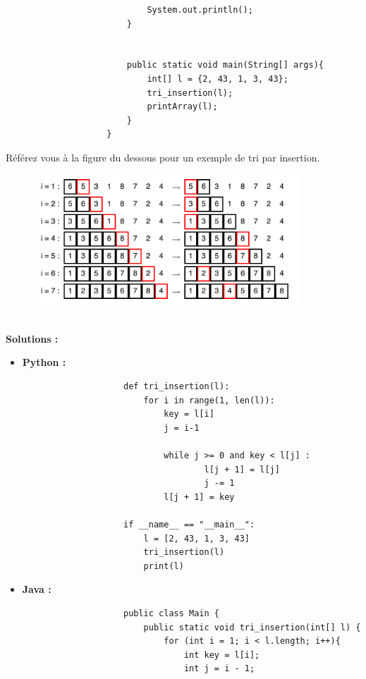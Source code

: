 \begin{Exercice} [20 minutes]
\begin{itemize}
\begin{verbatim}
                            System.out.println(); 
                        } 
              
                        
                        public static void main(String[] args){
                            int[] l = {2, 43, 1, 3, 43};
                            tri_insertion(l);
                            printArray(l);
                        }
                    }
                \end{verbatim}
    \end{itemize}
    
    \begin{conseil}
        Référez vous à la figure du dessous pour un exemple de tri par insertion.
    \end{conseil}
    
    \begin{figure}[htp]
        \centering
        \includegraphics[width=10cm]{ressources/tri_insertion.png}
    \end{figure}
    \ \\
    
    \textbf{Solutions :}
    \begin{itemize}
        \item \textbf{Python :}
                \begin{verbatim}
                    def tri_insertion(l):
                        for i in range(1, len(l)):
                            key = l[i] 
                            j = i-1
                            
                            while j >= 0 and key < l[j] : 
                                    l[j + 1] = l[j] 
                                    j -= 1
                            l[j + 1] = key 
                    
                    if __name__ == "__main__":
                        l = [2, 43, 1, 3, 43]
                        tri_insertion(l)
                        print(l)
                \end{verbatim}
        \item \textbf{Java :}
                \begin{verbatim}
                    public class Main {
                        public static void tri_insertion(int[] l) {
                            for (int i = 1; i < l.length; i++){
                                int key = l[i]; 
                                int j = i - 1; 
                      

\end{verbatim}
\end{itemize}
\end{Exercice}

